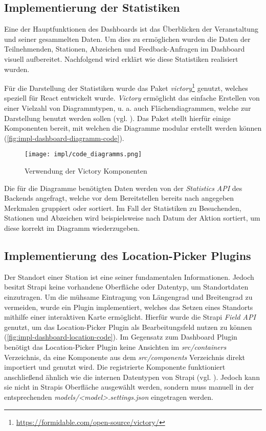 \subsection{Implementierung der Statistiken}

Eine der Hauptfunktionen des Dashboards ist das Überblicken der Veranstaltung
und seiner gesammelten Daten. Um dies zu ermöglichen wurden die Daten der
Teilnehmenden, Stationen, Abzeichen und Feedback-Anfragen im Dashboard visuell
aufbereitet. Nachfolgend wird erklärt wie diese Statistiken realisiert wurden.

Für die Darstellung der Statistiken wurde das Paket
\textit{victory}\footnote{\url{https://formidable.com/open-source/victory/}}
genutzt, welches speziell für React entwickelt wurde. \textit{Victory}
ermöglicht das einfache Erstellen von einer Vielzahl von Diagrammtypen, u. a.
auch Flächendiagrammen, welche zur Darstellung benutzt werden sollen (vgl.
). Das Paket stellt hierfür einige Komponenten bereit,
mit welchen die Diagramme modular erstellt werden können (\autoref{fig:impl-dashboard-diagramm-code}).

\begin{figure}[htpb]
    \centering
    \texttt{[image: impl/code\_diagramms.png]}
    \caption{Verwendung der Victory Komponenten}
    \label{fig:impl-dashboard-diagramm-code}
\end{figure}

Die für die Diagramme benötigten Daten werden von der \textit{Statistics API}
des Backends angefragt, welche vor dem Bereitstellen bereits nach angegeben
Merkmalen gruppiert oder sortiert. Im Fall der Statistiken zu Besuchenden,
Stationen und Abzeichen wird beispielsweise nach Datum der Aktion sortiert, um
diese korrekt im Diagramm wiederzugeben.

\subsection{Implementierung des Location-Picker Plugins} \label{ssec:impl-dashboard-location-plugin}

Der Standort einer Station ist eine seiner fundamentalen Informationen. Jedoch
besitzt Strapi keine vorhandene Oberfläche oder Datentyp, um Standortdaten
einzutragen. Um die mühsame Eintragung von Längengrad und Breitengrad zu
vermeiden, wurde ein Plugin implementiert, welches das Setzen eines Standorts
mithilfe einer interaktiven Karte ermöglicht. Hierfür wurde die Strapi
\textit{Field API} genutzt, um das Location-Picker Plugin als Bearbeitungsfeld
nutzen zu können (\autoref{fig:impl-dashboard-location-code}). Im Gegensatz
zum Dashboard Plugin benötigt das Location-Picker Plugin keine Ansichten im
\textit{src/containers} Verzeichnis, da eine Komponente aus dem
\textit{src/components} Verzeichnis direkt importiert und genutzt wird. Die
registrierte Komponente funktioniert anschließend ähnlich wie die internen
Datentypen von Strapi (vgl. ). Jedoch kann
sie nicht in Strapis Oberfläche ausgewählt werden, sondern muss manuell in der
entsprechenden \textit{models/<model>.settings.json} eingetragen werden.

